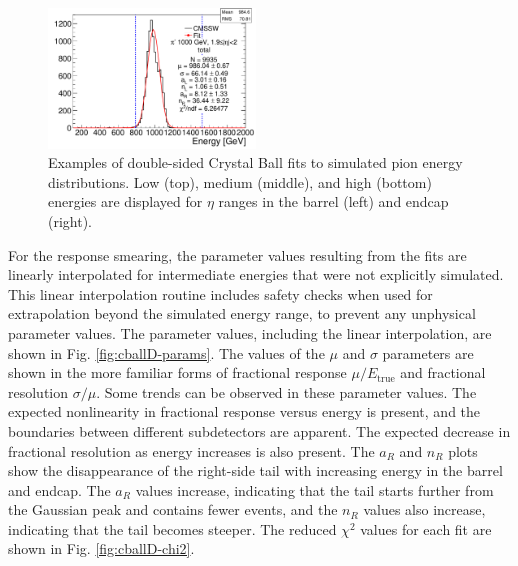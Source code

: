 \begin{figure}[hbtp]
\begin{center}
\includegraphics[width=0.49\textwidth]{figures/pion_response_tot_cballD_1000gev_ieta20.pdf}
\caption{Examples of double-sided Crystal Ball fits to simulated pion energy distributions. Low (top), medium (middle), and high (bottom) energies are displayed for $\eta$ ranges in the barrel (left) and endcap (right).}
\label{fig:cballD-fits}
\end{center}
\end{figure}

For the response smearing, the parameter values resulting from the fits are linearly interpolated for intermediate energies that were not explicitly simulated. This linear interpolation routine includes safety checks when used for extrapolation beyond the simulated energy range, to prevent any unphysical parameter values. The parameter values, including the linear interpolation, are shown in Fig. \ref{fig:cballD-params}. The values of the $\mu$ and $\sigma$ parameters are shown in the more familiar forms of fractional response $\mu/E_{\text{true}}$ and fractional resolution $\sigma/\mu$. Some trends can be observed in these parameter values. The expected nonlinearity in fractional response versus energy is present, and the boundaries between different subdetectors are apparent. The expected decrease in fractional resolution as energy increases is also present. The $a_{R}$ and $n_{R}$ plots show the disappearance of the right-side tail with increasing energy in the barrel and endcap. The $a_{R}$ values increase, indicating that the tail starts further from the Gaussian peak and contains fewer events, and the $n_{R}$ values also increase, indicating that the tail becomes steeper. The reduced $\chi^{2}$ values for each fit are shown in Fig. \ref{fig:cballD-chi2}.

